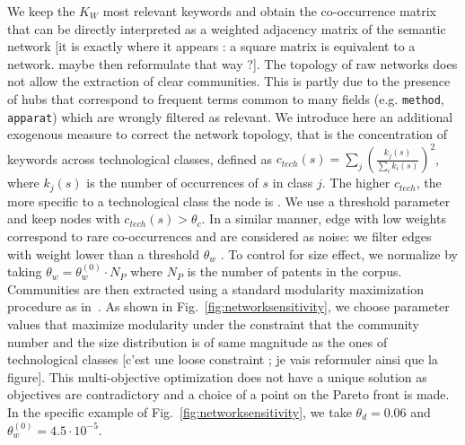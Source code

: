 \documentclass[10pt,A4]{article}
\begin{document}
We keep the $K_W$ most relevant keywords and obtain the co-occurrence matrix that can be directly interpreted as a weighted adjacency matrix of the semantic network [it is exactly where it appears : a square matrix is equivalent to a network. maybe then reformulate that way ?]. The topology of raw networks does not allow the extraction of clear communities. This is partly due to the presence of hubs that correspond to frequent terms common to many fields (e.g. \texttt{method}, \texttt{apparat}) which are wrongly filtered as relevant. We introduce here an additional exogenous measure to correct the network topology, that is the concentration of keywords across technological classes, defined as $c_{tech}(s) = \displaystyle \sum_j \left(\frac{k_j(s)}{\sum_i k_i(s)}\right)^2$,  where $k_j(s)$ is the number of occurrences of $s$ in class $j$. The higher $c_{tech}$, the more specific to a technological class the node is . We use a threshold parameter and keep nodes with $c_{tech}(s) > \theta_c$. In a similar manner, edge with low weights correspond to rare co-occurrences and are considered as noise: we filter edges with weight lower than a threshold $\theta_w$ . To control for size effect, we normalize by taking $\theta_w = \theta_w^{(0)}\cdot N_P$ where $N_P$ is the number of patents in the corpus. Communities are then extracted using a standard modularity maximization procedure as in~\cite{clauset2004finding}. As shown in Fig.~\ref{fig:networksensitivity}, we choose parameter values that maximize modularity under the constraint that the community number and the size distribution is of same magnitude as the ones of technological classes [c'est une loose constraint ; je vais reformuler ainsi que la figure]. This multi-objective optimization does not have a unique solution as objectives are contradictory and a choice of a point on the Pareto front is made. In the specific example of Fig.~\ref{fig:networksensitivity}, we take $\theta_d = 0.06$ and $\theta_w^{(0)} = 4.5\cdot 10^{-5}$.
\end{document}
